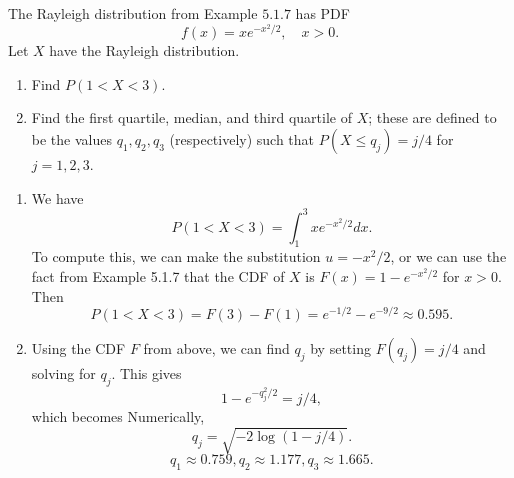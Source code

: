 

\setcounter{theorem}{0}
\begin{exercise}[BH.5.1] The Rayleigh distribution from Example $5.1 .7$ has PDF
    $$
    f(x)=x e^{-x^2 / 2}, \quad x>0 .
    $$
    Let $X$ have the Rayleigh distribution.
    \begin{enumerate}
        \item Find $P(1<X<3)$.
        \item Find the first quartile, median, and third quartile of $X$; these are defined to be the values $q_1, q_2, q_3$ (respectively) such that $P\left(X \leq q_j\right)=j / 4$ for $j=1,2,3$.
    \end{enumerate}   
\begin{solution}
    \begin{enumerate}
	    \item We have
	    $$
	    P(1<X<3)=\int_1^3 x e^{-x^2 / 2} d x .
	    $$
	    To compute this, we can make the substitution $u=-x^2 / 2$, or we can use the fact from Example 5.1.7 that the CDF of $X$ is $F(x)=1-e^{-x^2 / 2}$ for $x>0$. Then
	    $$
	    P(1<X<3)=F(3)-F(1)=e^{-1 / 2}-e^{-9 / 2} \approx 0.595 .
	    $$
		\item   Using the CDF $F$ from above, we can find $q_j$ by setting $F\left(q_j\right)=j / 4$ and solving for $q_j$. This gives
		 $$
		 1-e^{-q_j^2 / 2}=j / 4,
		 $$
		 which becomes
		 Numerically,
		 $$
		 q_j=\sqrt{-2 \log (1-j / 4)} .
		 $$
		 $$
		 q_1 \approx 0.759, q_2 \approx 1.177, q_3 \approx 1.665 .
		 $$
	\end{enumerate}
\end{solution}
\end{exercise}



